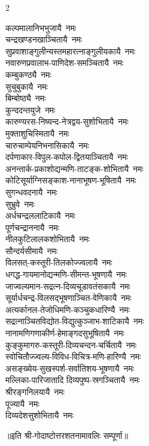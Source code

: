 \begin{multicols}{2}
\begin{flushleft}
कल्पमालानिभभुजायै~नमः\\
चन्द्रखण्डनखाञ्चितायै~नमः\hfill{}\\
सुप्रवाशाङ्गुलीन्यस्तमहा\-रत्नाङ्गुलीयकायै~नमः\\
नवारुणप्रवालाभ-पाणिदेश-समञ्चितायै~नमः\\
कम्बुकण्ठ्यै~नमः\\
सुचुबुकायै~नमः\\
बिम्बोष्ठ्यै~नमः\\
कुन्ददन्तयुजे~नमः\\
कारुण्यरस-निष्यन्द-नेत्रद्वय-सुशोभितायै~नमः\\
मुक्ताशुचिस्मितायै~नमः\\
चारुचाम्पेयनिभनासिकायै~नमः\\
दर्पणाकार-विपुल-कपोल-द्वितयाञ्चितायै~नमः\hfill{}\\
अनन्तार्क-प्रकाशोद्यन्मणि-ताटङ्क-शोभितायै~नमः\\
कोटिसूर्याग्निसङ्काश-नानाभूषण-भूषितायै~नमः\\
सुगन्धवदनायै~नमः\\
सुभ्रुवे~नमः\\
अर्धचन्द्रललाटिकायै~नमः\\
पूर्णचन्द्राननायै~नमः\\
नीलकुटिलालकशोभितायै~नमः\\
सौन्दर्यसीमायै~नमः\\
विलसत्-कस्तूरी-तिलकोज्ज्वलायै~नमः\\
धगद्ध-गायमानोद्यन्मणि-सीमन्त-भूषणायै~नमः\hfill{}\\
जाज्वल्यमान-सद्रत्न-दिव्यचूडावतंसकायै~नमः\\
सूर्यार्धचन्द्र-विलसद्भूषणाञ्चित-वेणिकायै~नमः\\
अत्यर्कानल-तेजोधिमणि-कञ्चुकधारिण्यै~नमः\\
सद्रत्नाञ्चितविद्योत-विद्युत्कुञ्जाभ-शाटिकायै~नमः\\
नानामणिगणाकीर्ण-हेमाङ्गदसुभूषितायै~नमः\\
कुङ्कुमागरु-कस्तूरी-दिव्यचन्दन-चर्चितायै~नमः\\
स्वोचितौज्ज्वल्य-विविध-विचित्र-मणि-हारिण्यै~नमः\\
असङ्ख्येय-सुखस्पर्श-सर्वातिशय-भूषणायै~नमः\\
मल्लिका-पारिजातादि  दिव्यपुष्प-स्रगञ्चितायै~नमः\\
श्रीरङ्गनिलयायै~नमः\hfill{}\\
पूज्यायै~नमः\\
दिव्यदेशसुशोभितायै~नमः\\
\end{flushleft}
\end{multicols}
॥इति श्री-गोदाष्टोत्तरशतनामावलिः सम्पूर्णा॥
